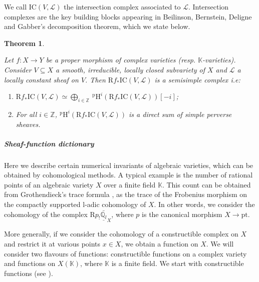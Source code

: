 \documentclass[11pt,english]{article}
\numberwithin{equation}{section}
\numberwithin{figure}{section}
\theoremstyle{definition}
\theoremstyle{plain}
\newtheorem{thm}[df]{Theorem}
\theoremstyle{remark}
\newcommand\HH{\mathrm{H}}
\newcommand\ZZ{\mathbb{Z}}
\newcommand\QQ{\mathbb{Q}}
\newcommand\KK{\mathbb{K}}
\begin{document}
We call $\mathrm{IC}(V,\mathcal{L})$ the intersection complex associated
to $\mathcal{L}$. Intersection complexes are the key building blocks
appearing in Beilinson, Bernstein, Deligne and Gabber's decomposition
theorem, which we state below.

\begin{thm}{\cite[Thm. 6.2.5.]{BBDG18}} \label{Thm/BBDGDecomp}

Let $f:X\rightarrow Y$ be a proper morphism of complex varieties
(resp. $\KK$-varieties). Consider $V\subseteq X$ a smooth, irreducible,
locally closed subvariety of $X$ and $\mathcal{L}$ a locally constant
sheaf on $V$. Then $\mathrm{R}f_{*}\mathrm{IC}(V,\mathcal{L})$ is
a semisimple complex i.e:
\begin{enumerate}
\item $\mathrm{R}f_{*}\mathrm{IC}(V,\mathcal{L})\simeq\bigoplus_{i\in\ZZ}\ ^{\mathrm{p}}\HH^{i}(\mathrm{R}f_{*}\mathrm{IC}(V,\mathcal{L}))[-i]$;
\item For all $i\in\ZZ$, $^{\mathrm{p}}\HH^{i}(\mathrm{R}f_{*}\mathrm{IC}(V,\mathcal{L}))$
is a direct sum of simple perverse sheaves.
\end{enumerate}
\end{thm}

\subparagraph*{Sheaf-function dictionary}

Here we describe certain numerical invariants of algebraic varieties,
which can be obtained by cohomological methods. A typical example
is the number of rational points of an algebraic variety $X$ over
a finite field $\KK$. This count can be obtained from Grothendieck's
trace formula \cite[Thm. 1.1.]{KW01}, as the trace of the Frobenius
morphism on the compactly supported l-adic cohomology of $X$. In
other words, we consider the cohomology of the complex $\mathrm{R}p_{!}\underline{\bar{\QQ_{l}}}_{X}$,
where $p$ is the canonical morphism $X\rightarrow\mathrm{pt}$.

More generally, if we consider the cohomology of a constructible complex
on $X$ and restrict it at various points $x\in X$, we obtain a function
on $X$. We will consider two flavours of functions: constructible
functions on a complex variety and functions on $X(\KK)$, where $\KK$
is a finite field. We start with constructible functions (see \cite[\S 4.1.]{Dim04}).
\end{document}
